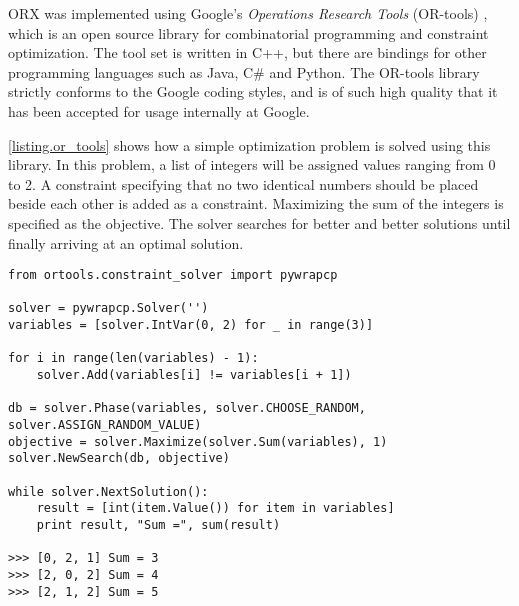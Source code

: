 ORX was implemented using Google's \emph{Operations Research Tools} (OR-tools) \cite{ortools}, which is an open source library for combinatorial programming and constraint optimization. The tool set is written in C++, but there are bindings for other programming languages such as Java, C\# and Python. The OR-tools library strictly conforms to the Google coding styles, and is of such high quality that it has been accepted for usage internally at Google.

\lstlistingname \space \ref{listing.or_tools} shows how a simple optimization problem is solved using this library. In this problem, a list of integers will be assigned values ranging from 0 to 2. A constraint specifying that no two identical numbers should be placed beside each other is added as a constraint. Maximizing the sum of the integers is specified as the objective. The solver searches for better and better solutions until finally arriving at an optimal solution.

\vspace{4mm}
\noindent\begin{minipage}{\textwidth}
\begin{lstlisting}[caption=OR-Tools Implementation Example, label={listing.or_tools}]
from ortools.constraint_solver import pywrapcp

solver = pywrapcp.Solver('')
variables = [solver.IntVar(0, 2) for _ in range(3)]

for i in range(len(variables) - 1):
    solver.Add(variables[i] != variables[i + 1])

db = solver.Phase(variables, solver.CHOOSE_RANDOM, solver.ASSIGN_RANDOM_VALUE)
objective = solver.Maximize(solver.Sum(variables), 1)
solver.NewSearch(db, objective)

while solver.NextSolution():
    result = [int(item.Value()) for item in variables]
    print result, "Sum =", sum(result)

>>> [0, 2, 1] Sum = 3
>>> [2, 0, 2] Sum = 4
>>> [2, 1, 2] Sum = 5
\end{lstlisting}
\end{minipage}